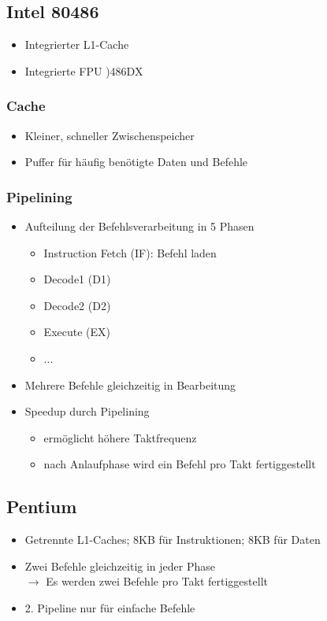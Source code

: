 \subsection{Intel 80486}
\begin{itemize}
	\item Integrierter L1-Cache
	\item Integrierte FPU )486DX
\end{itemize}
\subsubsection{Cache}
\begin{itemize}
	\item Kleiner, schneller Zwischenspeicher
	\item Puffer für häufig benötigte Daten und Befehle
\end{itemize}
\subsubsection{Pipelining}
\begin{itemize}
	\item Aufteilung der Befehlsverarbeitung in 5 Phasen
	\begin{itemize}
		\item Instruction Fetch (IF): Befehl laden
		\item Decode1 (D1)
		\item Decode2 (D2)
		\item Execute (EX)
		\item  ...
	\end{itemize}
	\item Mehrere Befehle gleichzeitig in Bearbeitung
	\item Speedup durch Pipelining
	\begin{itemize}
		\item ermöglicht höhere Taktfrequenz
		\item nach Anlaufphase wird ein Befehl pro Takt fertiggestellt
	\end{itemize}
\end{itemize}
\subsection{Pentium}
\begin{itemize}
	\item Getrennte L1-Caches; 8KB für Instruktionen; 8KB für Daten
	\item Zwei Befehle gleichzeitig in jeder Phase \\ \(\to\) Es werden zwei Befehle pro Takt fertiggestellt
	\item 2. Pipeline nur für einfache Befehle
\end{itemize}
